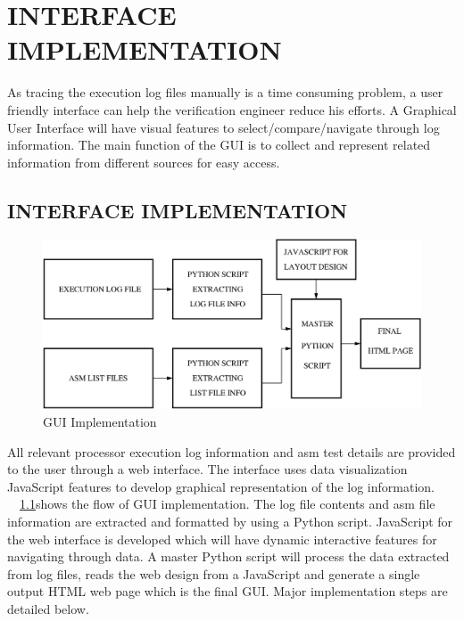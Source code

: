 \chapter{INTERFACE IMPLEMENTATION}
\label{chap:GUI_impl.tex}
As tracing the execution log files manually is a time consuming problem, a user friendly interface can help the verification engineer reduce his efforts. A Graphical User Interface will have visual features to select/compare/navigate through log information. The main function of the GUI is to collect and represent related information from different sources for easy access. 

\section {INTERFACE IMPLEMENTATION}
\begin{figure}[H]
\centering
\includegraphics[width=5.5in]{./figures/gui_impl.eps}
\caption{GUI Implementation} 
\label{fig:gui_impl.eps}
\end{figure}

 All relevant processor execution log information and asm test details are provided to the user through a web interface. The interface uses data visualization JavaScript features to develop graphical representation of the log information.
~\figurename{~\ref{fig:gui_impl.eps}}shows the flow of GUI implementation. The log file contents and asm file information are extracted and formatted by using a Python script. JavaScript for the web interface is developed which will have dynamic interactive features for navigating through data. A master Python script will process the data extracted from log files, reads the web design from a JavaScript and generate a single output HTML web page which is the final GUI. Major implementation steps are detailed below.


